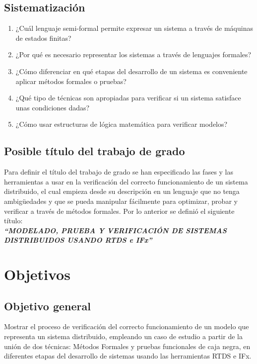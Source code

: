 \subsection{Sistematizaci\'on}

\begin{enumerate}

\item ¿Cu\'al lenguaje semi-formal permite expresar un sistema a trav\'es de 
m\'aquinas de estados finitas?
 \item ¿Por qu\'e es necesario representar los sistemas a trav\'es de lenguajes 
formales?
\item ¿C\'omo diferenciar en qu\'e etapas del desarrollo de un sistema es 
conveniente aplicar m\'etodos formales o pruebas?
\item ¿Qu\'e tipo de t\'ecnicas son apropiadas para verificar si un sistema 
satisface unas condiciones dadas?
\item ¿C\'omo usar estructuras de l\'ogica matem\'atica para verificar 
modelos?
\end{enumerate}

\subsection{Posible t\'itulo del trabajo de grado}
Para definir el t\'itulo del trabajo de grado se han especificado las fases y 
las herramientas a usar en la verificaci\'on del correcto funcionamiento de un 
sistema distribuido, el cual empieza desde su descripci\'on en un lenguaje que 
no tenga ambig\"uedades y que se pueda manipular f\'acilmente para optimizar, 
probar y verificar a trav\'es de m\'etodos formales. Por lo anterior se 
defini\'o el siguiente t\'itulo:
\\

\textbf{\textit{``MODELADO, PRUEBA Y VERIFICACI\'ON DE SISTEMAS DISTRIBUIDOS 
USANDO RTDS e IFx''}}


\section{Objetivos}

\subsection{Objetivo general}

Mostrar el proceso de verificaci\'on del correcto funcionamiento de un modelo 
que representa un sistema distribuido, empleando un caso de estudio a partir de 
la uni\'on de dos t\'ecnicas: M\'etodos Formales y pruebas funcionales de 
caja negra, en diferentes etapas del desarrollo de sistemas usando las 
herramientas RTDS e IFx.

